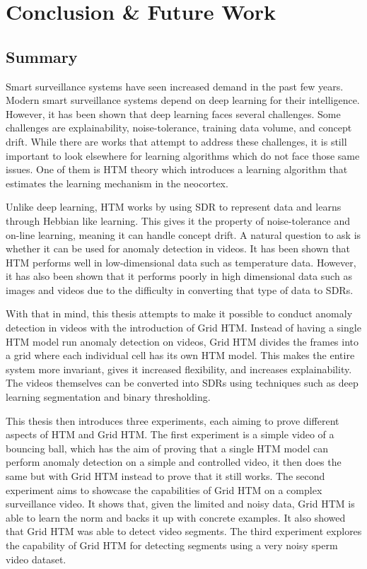 \chapter{Conclusion \& Future Work}
\label{sec:conclusion}
\section{Summary}
Smart surveillance systems have seen increased demand in the past few years. Modern smart surveillance systems depend on deep learning for their intelligence. However, it has been shown that deep learning faces several challenges. Some challenges are explainability, noise-tolerance, training data volume, and concept drift. While there are works that attempt to address these challenges, it is still important to look elsewhere for learning algorithms which do not face those same issues. One of them is HTM theory which introduces a learning algorithm that estimates the learning mechanism in the neocortex.
\par
Unlike deep learning, HTM works by using SDR to represent data and learns through Hebbian like learning. This gives it the property of noise-tolerance and on-line learning, meaning it can handle concept drift. A natural question to ask is whether it can be used for anomaly detection in videos. It has been shown that HTM performs well in low-dimensional data such as temperature data. However, it has also been shown that it performs poorly in high dimensional data such as images and videos due to the difficulty in converting that type of data to SDRs.
\par
With that in mind, this thesis attempts to make it possible to conduct anomaly detection in videos with the introduction of Grid HTM. Instead of having a single HTM model run anomaly detection on videos, Grid HTM divides the frames into a grid where each individual cell has its own HTM model. This makes the entire system more invariant, gives it increased flexibility, and increases explainability. The videos themselves can be converted into SDRs using techniques such as deep learning segmentation and binary thresholding.
\par
This thesis then introduces three experiments, each aiming to prove different aspects of HTM and Grid HTM. The first experiment is a simple video of a bouncing ball, which has the aim of proving that a single HTM model can perform anomaly detection on a simple and controlled video, it then does the same but with Grid HTM instead to prove that it still works. The second experiment aims to showcase the capabilities of Grid HTM on a complex surveillance video. It shows that, given the limited and noisy data, Grid HTM is able to learn the norm and backs it up with concrete examples. It also showed that Grid HTM was able to detect video segments. The third experiment explores the capability of Grid HTM for detecting segments using a very noisy sperm video dataset.
